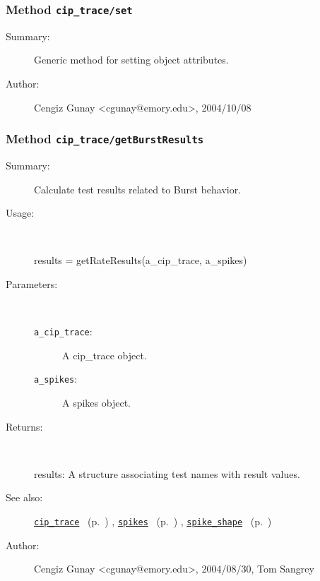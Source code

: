 \subsubsection[Method \texttt{set}]{Method \texttt{cip\_trace/set}}%
%
\label{ref_cip_trace__set}%
\hypertarget{ref_cip_trace__set}{}%
\begin{description}
\item[Summary:]Generic method for setting object attributes.
%
%
%
%
%
%
%
\item[Author:]%
Cengiz Gunay <cgunay@emory.edu>, 2004/10/08%
\end{description}
\methodline%
\subsubsection[Method \texttt{getBurstResults}]{Method \texttt{cip\_trace/getBurstResults}}%
%
\label{ref_cip_trace__getBurstResults}%
\hypertarget{ref_cip_trace__getBurstResults}{}%
\begin{description}
\item[Summary:]Calculate test results related to Burst behavior.
%
\item[Usage:]~%
\begin{lyxcode}%
results = getRateResults(a\_cip\_trace, a\_spikes)
%
\end{lyxcode}%
%
%
\item[Parameters:]~
\begin{description}%
\item[\texttt{a\_cip\_trace}:]
 A cip\_trace object.
\item[\texttt{a\_spikes}:]
 A spikes object.
\end{description}%
%
\item[Returns:]~

	results: A structure associating test names with result values.
%
%
\item[See also:]%
\hyperlink{ref_cip_trace}{\texttt{cip\_trace}}%
\ (p.~\pageref{ref_cip_trace})%
%
, \hyperlink{ref_spikes}{\texttt{spikes}}%
\ (p.~\pageref{ref_spikes})%
%
, \hyperlink{ref_spike_shape}{\texttt{spike\_shape}}%
\ (p.~\pageref{ref_spike_shape})%
%
%
\item[Author:]%
Cengiz Gunay <cgunay@emory.edu>, 2004/08/30, Tom Sangrey%
\end{description}
\methodline%
